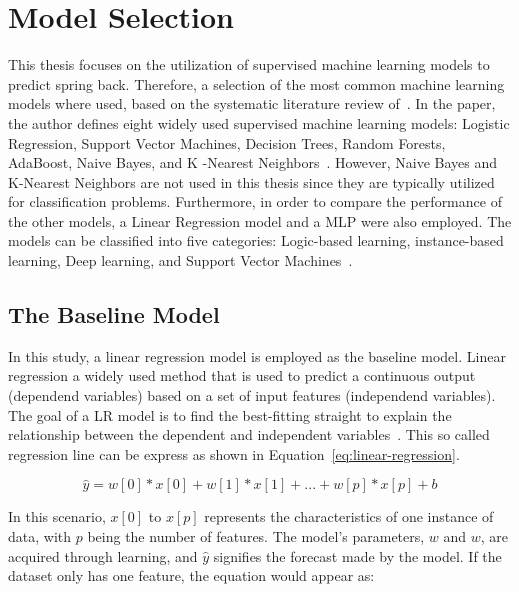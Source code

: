 \section{Model Selection}\label{sec:model-selection}
This thesis focuses on the utilization of supervised machine learning models to predict
spring back.
Therefore, a selection of the most common machine learning models where used, based on
the systematic literature review of~\cite{dridi2021supervised}.
In the paper, the author defines eight widely used supervised machine learning models: Logistic
Regression, Support Vector Machines, Decision Trees, Random Forests, AdaBoost, Naive Bayes,
and K -Nearest Neighbors~\cite[p. 8]{dridi2021supervised}.
However, Naive Bayes and K-Nearest Neighbors are not used in this thesis since they are typically
utilized for classification problems.
Furthermore, in order to compare the performance of the other models, a Linear Regression model
and a \ac{MLP} were also employed.
The models can be classified into five categories: Logic-based learning, instance-based learning, Deep learning, and
Support Vector Machines~\cite[p. 8]{dridi2021supervised}.

\subsection{The Baseline Model}\label{subsec:regression-models}
In this study, a linear regression model is employed as the baseline model.
Linear regression a widely used method that is used to predict a continuous output (dependend variables) based on a set
of input features (independend variables).
The goal of a \ac{LR} model is to find the best-fitting straight to explain the relationship between the dependent
and independent variables~\cite[p. 45]{muller_introductionmachinelearning_2016}.
This so called regression line can be express as shown in Equation~\ref{eq:linear-regression}.

\begin{tcolorbox}[arc=0pt,boxrule=0.5pt]
    \begin{equation}
        \hat{y} = w[0] * x[0] + w[1] * x[1] + ... + w[p] * x[p] + b
        \label{eq:linear-regression}
    \end{equation}
\end{tcolorbox}

In this scenario, $x[0]$ to $x[p]$ represents the characteristics of one instance of data, with $p$ being the number of
features.
The model's parameters, $w$ and $w$, are acquired through learning, and $\hat{y}$ signifies the forecast made by the
model.
If the dataset only has one feature, the equation would appear as:

